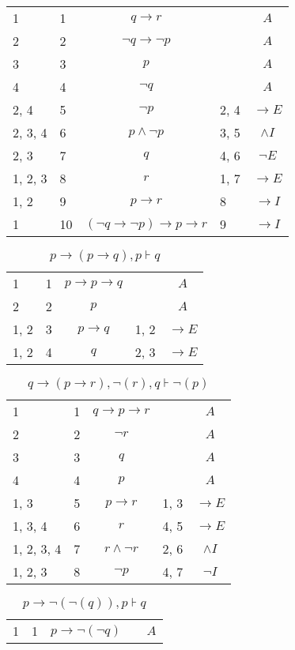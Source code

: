 \documentclass{article}
\begin{document}
\begin{table}[htbp]
\begin{tabular}{lllll}
{1} & 1 & $$q→r$$ & {} & $$A$$ \\
{2} & 2 & $$¬q→ ¬p$$ & {} & $$A$$ \\
{3} & 3 & $$p$$ & {} & $$A$$ \\
{4} & 4 & $$¬q$$ & {} & $$A$$ \\
{2, 4} & 5 & $$¬p$$ & {2, 4} & $$→E$$ \\
{2, 3, 4} & 6 & $$p∧ ¬p$$ & {3, 5} & $$∧I$$ \\
{2, 3} & 7 & $$q$$ & {4, 6} & $$¬E$$ \\
{1, 2, 3} & 8 & $$r$$ & {1, 7} & $$→E$$ \\
{1, 2} & 9 & $$p→r$$ & {8} & $$→I$$ \\
{1} & 10 & $$(¬q→ ¬p)→p→r$$ & {9} & $$→I$$ \\
\end{tabular}
\end{table}\begin{table}[htbp]\caption*{$p → (p → q),p ⊦ q$}\centering\begin{tabular}{lllll}
{1} & 1 & $$p→p→q$$ & {} & $$A$$ \\
{2} & 2 & $$p$$ & {} & $$A$$ \\
{1, 2} & 3 & $$p→q$$ & {1, 2} & $$→E$$ \\
{1, 2} & 4 & $$q$$ & {2, 3} & $$→E$$ \\
\end{tabular}
\end{table}\begin{table}[htbp]\caption*{$q → (p → r),¬(r),q ⊦ ¬(p)$}\centering\begin{tabular}{lllll}
{1} & 1 & $$q→p→r$$ & {} & $$A$$ \\
{2} & 2 & $$¬r$$ & {} & $$A$$ \\
{3} & 3 & $$q$$ & {} & $$A$$ \\
{4} & 4 & $$p$$ & {} & $$A$$ \\
{1, 3} & 5 & $$p→r$$ & {1, 3} & $$→E$$ \\
{1, 3, 4} & 6 & $$r$$ & {4, 5} & $$→E$$ \\
{1, 2, 3, 4} & 7 & $$r∧ ¬r$$ & {2, 6} & $$∧I$$ \\
{1, 2, 3} & 8 & $$¬p$$ & {4, 7} & $$¬I$$ \\
\end{tabular}
\end{table}\begin{table}[htbp]\caption*{$p → ¬(¬(q)),p ⊦ q$}\centering\begin{tabular}{lllll}
{1} & 1 & $$p→ ¬ (¬q)$$ & {} & $$A$$ \\

\end{tabular}
\end{table}
\end{document}
